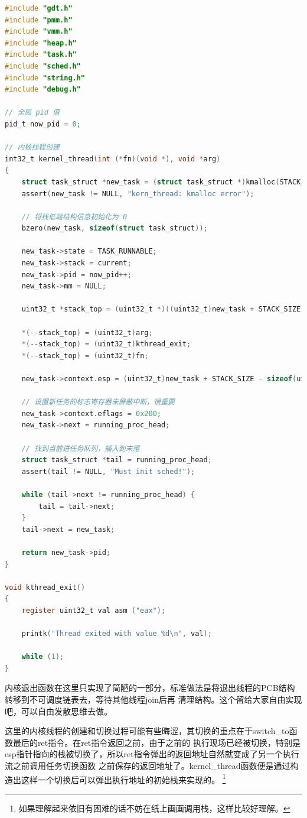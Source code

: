 \begin{lstlisting}[language = C, caption = include/task.h]
#include "gdt.h"
#include "pmm.h"
#include "vmm.h"
#include "heap.h"
#include "task.h"
#include "sched.h"
#include "string.h"
#include "debug.h"

// 全局 pid 值
pid_t now_pid = 0;

// 内核线程创建
int32_t kernel_thread(int (*fn)(void *), void *arg)
{
	struct task_struct *new_task = (struct task_struct *)kmalloc(STACK_SIZE);
	assert(new_task != NULL, "kern_thread: kmalloc error");

	// 将栈低端结构信息初始化为 0 
	bzero(new_task, sizeof(struct task_struct));

	new_task->state = TASK_RUNNABLE;
	new_task->stack = current;
	new_task->pid = now_pid++;
	new_task->mm = NULL;

	uint32_t *stack_top = (uint32_t *)((uint32_t)new_task + STACK_SIZE);

	*(--stack_top) = (uint32_t)arg;
	*(--stack_top) = (uint32_t)kthread_exit;
	*(--stack_top) = (uint32_t)fn;

	new_task->context.esp = (uint32_t)new_task + STACK_SIZE - sizeof(uint32_t) * 3;

	// 设置新任务的标志寄存器未屏蔽中断，很重要
	new_task->context.eflags = 0x200;
	new_task->next = running_proc_head;
	
	// 找到当前进任务队列，插入到末尾
	struct task_struct *tail = running_proc_head;
	assert(tail != NULL, "Must init sched!");

	while (tail->next != running_proc_head) {
		tail = tail->next;
	}
	tail->next = new_task;

	return new_task->pid;
}

void kthread_exit()
{
	register uint32_t val asm ("eax");

	printk("Thread exited with value %d\n", val);

	while (1);
}

\end{lstlisting}

\par 内核退出函数在这里只实现了简陋的一部分，标准做法是将退出线程的PCB结构转移到不可调度链表去，等待其他线程join后再\allowbreak
清理结构。这个留给大家自由实现吧，可以自由发散思维去做。

\par 这里的内核线程的创建和切换过程可能有些晦涩，其切换的重点在于switch\_to函数最后的ret指令。在ret指令返回之前，由于之前的\allowbreak
执行现场已经被切换，特别是esp指针指向的栈被切换了，所以ret指令弹出的返回地址自然就变成了另一个执行流之前调用任务切换函数\allowbreak
之前保存的返回地址了。kernel\_thread函数便是通过构造出这样一个切换后可以弹出执行地址的初始栈来实现的。
\footnote{如果理解起来依旧有困难的话不妨在纸上画画调用栈，这样比较好理解。}

